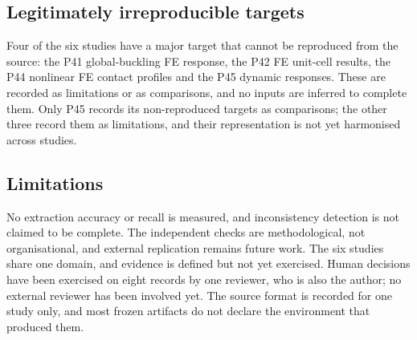 \subsection{Legitimately irreproducible targets}
Four of the six studies have a major target that cannot be reproduced from the source: the P41 global-buckling FE response, the P42 FE unit-cell results, the P44 nonlinear FE contact profiles and the P45 dynamic responses. These are recorded as limitations or as  comparisons, and no inputs are inferred to complete them. Only P45 records its non-reproduced targets as  comparisons; the other three record them as limitations, and their representation is not yet harmonised across studies.

\subsection{Limitations}
No extraction accuracy or recall is measured, and inconsistency detection is not claimed to be complete. The independent checks are methodological, not organisational, and external replication remains future work. The six studies share one domain, and  evidence is defined but not yet exercised. Human decisions have been exercised on eight records by one reviewer, who is also the author; no external reviewer has been involved yet. The source format is recorded for one study only, and most frozen artifacts do not declare the environment that produced them.
